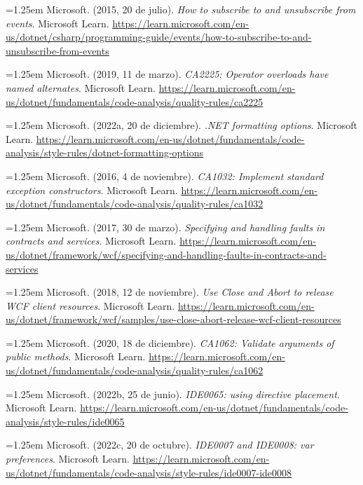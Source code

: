 \smallskip
\noindent\hangindent=1.25em Microsoft. (2015, 20 de julio). \textit{How to subscribe to and unsubscribe from events}. Microsoft Learn. \url{https://learn.microsoft.com/en-us/dotnet/csharp/programming-guide/events/how-to-subscribe-to-and-unsubscribe-from-events}

\smallskip
\noindent\hangindent=1.25em Microsoft. (2019, 11 de marzo). \textit{CA2225: Operator overloads have named alternates}. Microsoft Learn. \url{https://learn.microsoft.com/en-us/dotnet/fundamentals/code-analysis/quality-rules/ca2225}

\smallskip
\noindent\hangindent=1.25em Microsoft. (2022a, 20 de diciembre). \textit{.NET formatting options}. Microsoft Learn. \url{https://learn.microsoft.com/en-us/dotnet/fundamentals/code-analysis/style-rules/dotnet-formatting-options}

\smallskip
\noindent\hangindent=1.25em Microsoft. (2016, 4 de noviembre). \textit{CA1032: Implement standard exception constructors}. Microsoft Learn. \url{https://learn.microsoft.com/en-us/dotnet/fundamentals/code-analysis/quality-rules/ca1032}

\smallskip
\noindent\hangindent=1.25em Microsoft. (2017, 30 de marzo). \textit{Specifying and handling faults in contracts and services}. Microsoft Learn. \url{https://learn.microsoft.com/en-us/dotnet/framework/wcf/specifying-and-handling-faults-in-contracts-and-services}

\smallskip
\noindent\hangindent=1.25em Microsoft. (2018, 12 de noviembre). \textit{Use Close and Abort to release WCF client resources}. Microsoft Learn. \url{https://learn.microsoft.com/en-us/dotnet/framework/wcf/samples/use-close-abort-release-wcf-client-resources}

\smallskip
\noindent\hangindent=1.25em Microsoft. (2020, 18 de diciembre). \textit{CA1062: Validate arguments of public methods}. Microsoft Learn. \url{https://learn.microsoft.com/en-us/dotnet/fundamentals/code-analysis/quality-rules/ca1062}

\smallskip
\noindent\hangindent=1.25em Microsoft. (2022b, 25 de junio). \textit{IDE0065: using directive placement}. Microsoft Learn. \url{https://learn.microsoft.com/en-us/dotnet/fundamentals/code-analysis/style-rules/ide0065}

\smallskip
\noindent\hangindent=1.25em Microsoft. (2022c, 20 de octubre). \textit{IDE0007 and IDE0008: var preferences}. Microsoft Learn. \url{https://learn.microsoft.com/en-us/dotnet/fundamentals/code-analysis/style-rules/ide0007-ide0008}

